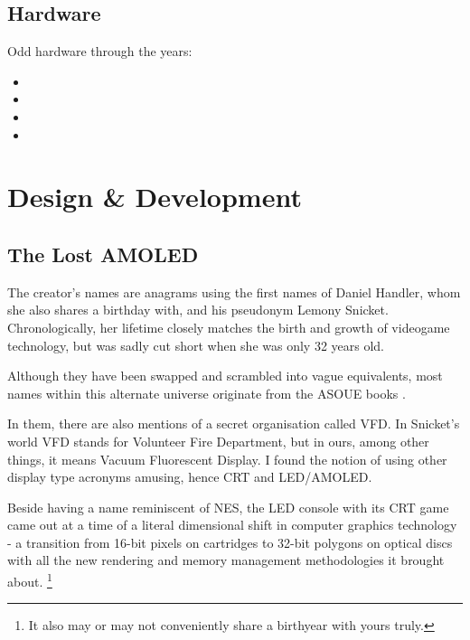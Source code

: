 \documentclass[12pt,oneside]{book}
\begin{document}
\section{Hardware}
    Odd hardware through the years:
\begin{itemize}[label=]
    \item {}
    \item {} 
    \item {}
    \item {}
\end{itemize}

\chapter{Design \& Development\label{chap:4-dnd}}

\section{The Lost AMOLED}
The creator's names are anagrams using the first names of Daniel Handler, whom she also shares a birthday with, and his pseudonym Lemony Snicket. Chronologically, her lifetime closely matches the birth and growth of videogame technology, but was sadly cut short when she was only 32 years old.\par
Although they have been swapped and scrambled into vague equivalents, most names within this alternate universe originate from the ASOUE books \parencite{asoue}.\par
In them, there are also mentions of a secret organisation called VFD. In Snicket's world VFD stands for Volunteer Fire Department, but in ours, among other things, it means Vacuum Fluorescent Display. I found the notion of using other display type acronyms amusing, hence CRT and LED/AMOLED.\par
Beside having a name reminiscent of NES, the LED console with its CRT game came out at a time of a literal dimensional shift in computer graphics technology - a transition from 16-bit pixels on cartridges to 32-bit polygons on optical discs with all the new rendering and memory management methodologies it brought about.
\footnote{It also may or may not conveniently share a birthyear with yours truly.}
\end{document}
